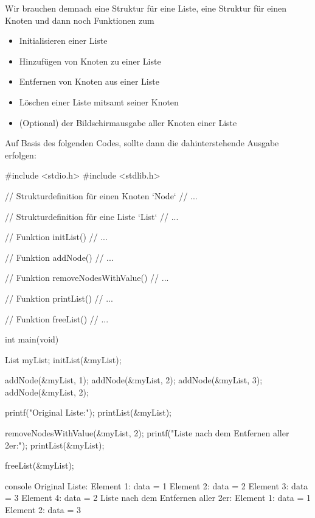 Wir brauchen demnach eine Struktur für eine Liste, eine Struktur für einen
Knoten und dann noch Funktionen zum
\begin{itemize}
    \item Initialisieren einer Liste
    \item Hinzufügen von Knoten zu einer Liste
    \item Entfernen von Knoten aus einer Liste
    \item Löschen einer Liste mitsamt seiner Knoten
    \item (Optional) der Bildschirmausgabe aller Knoten einer Liste
\end{itemize}

Auf Basis des folgenden Codes, sollte dann die dahinterstehende Ausgabe
erfolgen:

\begin{codebox}[lang=c, fontsize=\small]
#include <stdio.h>
#include <stdlib.h>

// Strukturdefinition für einen Knoten `Node`
// ...

// Strukturdefinition für eine Liste `List`
// ...

// Funktion initList()
// ...

// Funktion addNode()
// ...

// Funktion removeNodesWithValue()
// ...

// Funktion printList()
// ...

// Funktion freeList()
// ...

int main(void) {
    List myList;
    initList(&myList);

    addNode(&myList, 1);
    addNode(&myList, 2);
    addNode(&myList, 3);
    addNode(&myList, 2);

    printf("Original Liste:\n");
    printList(&myList);

    removeNodesWithValue(&myList, 2);
    printf("Liste nach dem Entfernen aller 2er:\n");
    printList(&myList);

    freeList(&myList);
}
\end{codebox}

\begin{mybox}[Bildschirmausgabe]{console}
Original Liste:
Element 1: data = 1
Element 2: data = 2
Element 3: data = 3
Element 4: data = 2
Liste nach dem Entfernen aller 2er:
Element 1: data = 1
Element 2: data = 3
\end{mybox}


